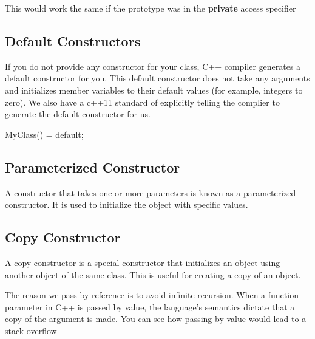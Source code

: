 \documentclass{report}
\begin{document}
    \bigbreak \noindent 
    \begin{notebox}
        This would work the same if the prototype was in the \textbf{private} access specifier
    \end{notebox}
    

    \pagebreak
    \subsection{Default Constructors}
    \bigbreak \noindent 
    \begin{concept}
        If you do not provide any constructor for your class, C++ compiler generates a default constructor for you. This default constructor does not take any arguments and initializes member variables to their default values (for example, integers to zero).
        \bigbreak \noindent 
        We also have a c++11 standard of explicitly telling the complier to generate the default constructor for us.
        \bigbreak \noindent 
        \begin{cppcode}
        MyClass() = default;
        \end{cppcode}
    \end{concept}

    \bigbreak \noindent 
    \subsection{Parameterized Constructor}
    \bigbreak \noindent 
    \begin{concept}
        A constructor that takes one or more parameters is known as a parameterized constructor. It is used to initialize the object with specific values.
    \end{concept}
    
    \bigbreak \noindent 
    \subsection{Copy Constructor}
    \bigbreak \noindent 
    \begin{concept}
        A copy constructor is a special constructor that initializes an object using another object of the same class. This is useful for creating a copy of an object.
    \end{concept}
    \bigbreak \noindent 
    \begin{cppcode}
class Rectangle {
    int width, height;
public:

// Copy constructor
    Rectangle(const Rectangle& other) {
        width = other.width;
        height = other.height;
    }
];
    \end{cppcode}
    \bigbreak \noindent 
    \begin{notebox}
        The reason we pass by reference is to avoid infinite recursion. When a function parameter in C++ is passed by value, the language's semantics dictate that a copy of the argument is made. You can see how passing by value would lead to a stack overflow
    \end{notebox}
    \bigbreak \noindent 
\end{document}
